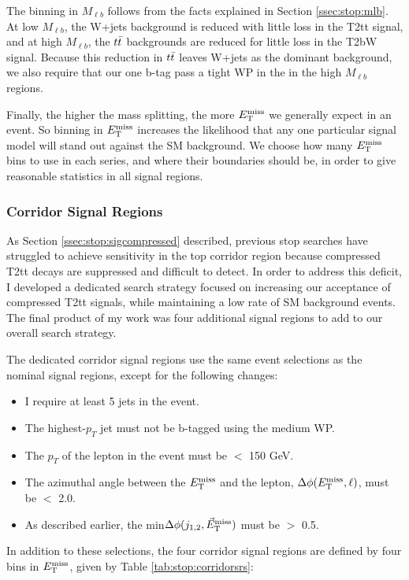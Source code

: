 The binning in $M_{\ell b}$ follows from the facts explained in
Section \ref{ssec:stop:mlb}. At low $M_{\ell b}$, the W+jets
background is reduced with little loss in the T2tt signal, and at high
$M_{\ell b}$, the $t\bar{t}$ backgrounds are reduced for little loss in
the T2bW signal. Because this reduction in $t\bar{t}$ leaves W+jets as
the dominant background, we also require that our one b-tag pass a
tight WP in the in the high $M_{\ell b}$ regions.

Finally, the higher the mass splitting, the more $E_\text{T}^\text{miss}$ we generally
expect in an event. So binning in $E_\text{T}^\text{miss}$ increases the
likelihood that any one particular signal model will stand out against the
SM background. We choose how many $E_\text{T}^\text{miss}$ bins to use in each series,
and where their boundaries should be, in order to give reasonable
statistics in all signal regions.

\subsubsection*{Corridor Signal Regions}

As Section \ref{ssec:stop:sigcompressed} described, previous stop
searches have struggled to achieve sensitivity in the top corridor
region because compressed T2tt decays are suppressed and difficult to
detect. In order to address this deficit, I developed a dedicated
search strategy focused on increasing our acceptance of compressed
T2tt signals, while maintaining a low rate of SM background
events. The final product of my work was four additional signal
regions to add to our overall search strategy.

The dedicated corridor signal regions use the same event selections as
the nominal signal regions, except for the following changes:
\begin{itemize}
\item I require at least 5 jets in the event.
\item The highest-$p_T$ jet must not be b-tagged using the medium WP.
\item The $p_T$ of the lepton in the event must be $<$ 150 GeV.
\item The azimuthal angle between the $E_\text{T}^\text{miss}$ and the lepton, $\Delta
  \phi (E_\text{T}^\text{miss}, \ell)$, must be $<$ 2.0.
\item As described earlier, the min$\Delta \phi(j_{1,2},\vec{E}_\text{T}^\text{miss})$
  must be $>$ 0.5.
\end{itemize}
In addition to these selections, the four corridor signal regions are
defined by four bins in $E_\text{T}^\text{miss}$, given by Table \ref{tab:stop:corridorsrs}:

